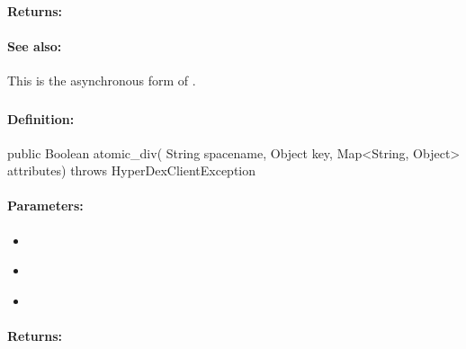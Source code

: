 \paragraph{Returns:}


\paragraph{See also:}  This is the asynchronous form of .

\pagebreak
\subsubsection{}
\label{api:java:atomic_div}


\paragraph{Definition:}
\begin{javacode}
public Boolean atomic_div(
        String spacename,
        Object key,
        Map<String, Object> attributes) throws HyperDexClientException
\end{javacode}

\paragraph{Parameters:}
\begin{itemize}[noitemsep]
\item {}\\

\item {}\\

\item {}\\

\end{itemize}

\paragraph{Returns:}


